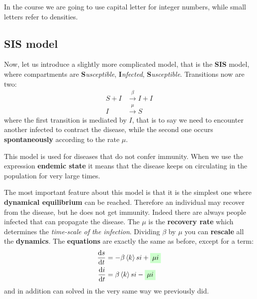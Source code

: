 \documentclass[../main/main.tex]{subfiles}
\begin{document}
\begin{remark}
In the course we are going to use capital letter for integer numbers, while small letters refer to densities.
\end{remark}

\subsection{SIS model}
Now, let us introduce a slightly more complicated model, that is the \textbf{SIS} model, where compartments are \textbf{S}\textit{usceptible}, \textbf{I}\textit{nfected}, \textbf{S}\textit{usceptible}. Transitions now are two:
\begin{equation}
\begin{split}
  S + I &\overset{\beta }{\rightarrow } I + I \\
  I &\overset{\mu }{\rightarrow } S
\end{split}
\end{equation}
where the first transition is mediated by $I$, that is to say we need to encounter another infected to contract the disease, while the second one occurs \textbf{spontaneously} according to the rate $\mu$.

This model is used for diseases that do not confer immunity. When we use the expression \textbf{endemic state} it means that the disease keeps on circulating in the population for very large times.

The most important feature about this model is that it is the simplest one where \textbf{dynamical equilibrium} can be reached. Therefore an individual may recover from the disease, but he does not get immunity. Indeed there are always people infected that can propagate the disease. The $ \mu  $ is the \textbf{recovery rate} which determines the \textit{time-scale of the infection}. Dividing \( \beta  \) by \( \mu  \) you can \textbf{rescale} all the \textbf{dynamics}.
The \textbf{equations} are exactly the same as before, except for a term:
\begin{equation}
\begin{split}
  \dv{s}{t} &= - \beta \expval{k} si + \mathcolorbox{green!20}{\mu i}  \\
  \dv{i}{t} &= \beta \expval{k} si - \mathcolorbox{green!20}{\mu i}
\end{split}
\end{equation}
and in addition can solved in the very same way we previously did.
\end{document}
